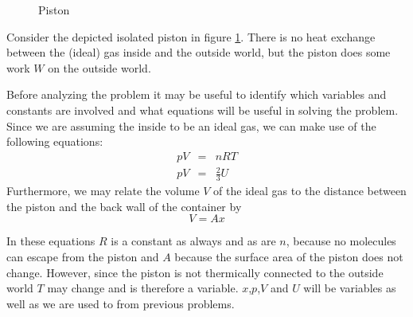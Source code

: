 \documentclass[12pt,letterpaper]{article}
\begin{document}
\begin{figure}
\label{piston}
\begin{center}
\end{center}
\caption{Piston}
\end{figure}

Consider the depicted isolated piston in figure \ref{piston}. There is no heat exchange between the (ideal) gas inside and the outside world, but the piston does some work $W$ on the outside world. 

Before analyzing the problem it may be useful to identify which variables and constants are involved and what equations will be useful in solving the problem. Since we are assuming the inside to be an ideal gas, we can make use of the following equations:
\begin{eqnarray*}
	pV &=& nRT\\
	pV &=& \frac{2}{3}U
\end{eqnarray*}
Furthermore, we may relate the volume $V$ of the ideal gas to the distance between the piston and the back wall of the container by
\[ V = Ax \]

In these equations $R$ is a constant as always and as are $n$, because no molecules can escape from the piston and $A$ because the surface area of the piston does not change. However, since the piston is not thermically  connected to the outside world $T$ may change and is therefore a variable. $x$,$p$,$V$ and $U$ will be variables as well as we are used to from previous problems.
\end{document}
